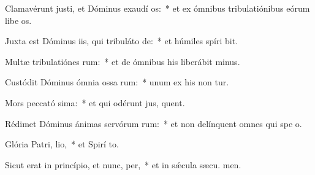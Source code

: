 \item Clamavérunt justi, et Dóminus exaudí os:~* et ex ómnibus tribulatiónibus eórum libe os.
\item Juxta est Dóminus iis, qui tribuláto  de:~* et húmiles spíri bit.
\item Multæ tribulatiónes rum:~* et de ómnibus his liberábit  minus.
\item Custódit Dóminus ómnia ossa rum:~* unum ex his non tur.
\item Mors peccató sima:~* et qui odérunt jus, quent.
\item Rédimet Dóminus ánimas servórum rum:~* et non delínquent omnes qui spe  o.
\item Glória Patri,  lio,~* et Spirí to.
\item Sicut erat in princípio, et nunc,  per,~* et in sǽcula sæcu. men.

